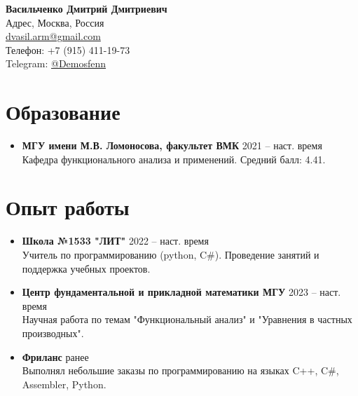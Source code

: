 \documentclass[a4paper,10pt]{article}
\begin{document}
	
	\begin{center}
		{\Huge \textbf{Васильченко Дмитрий Дмитриевич}} \\[0.5em]
		{Адрес, Москва, Россия} \\
		\href{mailto:dvasil.arm@gmail.com}{dvasil.arm@gmail.com} \\
		{Телефон: +7 (915) 411-19-73} \\
		{Telegram: \href{https://t.me/Demosfenn}{@Demosfenn}}
	\end{center}
	
	\vspace{1em}
	
	\section*{Образование}
	\begin{itemize}[left=0pt]
		\item \textbf{МГУ имени М.В. Ломоносова, факультет ВМК} \hfill 2021 -- наст. время \\
		Кафедра функционального анализа и применений. Средний балл: 4.41.
	\end{itemize}
	
	\section*{Опыт работы}
	\begin{itemize}[left=0pt]
		\item \textbf{Школа №1533 "ЛИТ"} \hfill 2022 -- наст. время \\
		Учитель по программированию (python, C$\#$). Проведение занятий и поддержка учебных проектов.
		\item \textbf{Центр фундаментальной и прикладной математики МГУ} \hfill 2023 -- наст. время \\
		Научная работа по темам "Функциональный анализ" и "Уравнения в частных производных".
		\item \textbf{Фриланс} \hfill ранее \\
		Выполнял небольшие заказы по программированию на языках C++, C$\#$, Assembler, Python.
	\end{itemize}
	
\end{document}

